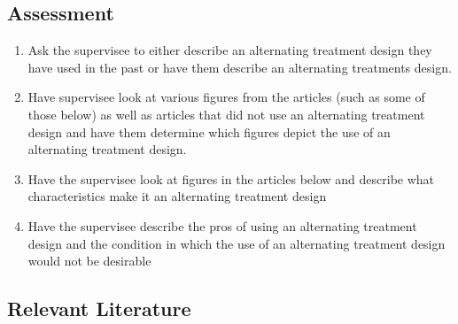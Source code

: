 \subsection{Assessment}
\begin{enumerate}
\item Ask the supervisee to either describe an alternating treatment design they have used in the past or have them describe an alternating treatments design.
\item Have supervisee look at various figures  from the articles (such as some of those below) as well as articles that did not use an alternating treatment design and have them determine which figures depict the use of an alternating treatment design. 
\item Have the supervisee look at figures in the articles below and describe what characteristics make it an alternating treatment design
\item Have the supervisee describe the pros of using an alternating treatment design and the condition in which the use of an alternating treatment design would not be desirable
\end{enumerate}
%
\subsection{Relevant Literature}
\begin{refsection}
\nocite{test,alang2017police,clayton2018black}
\printbibliography[heading=none]
\end{refsection}
%
